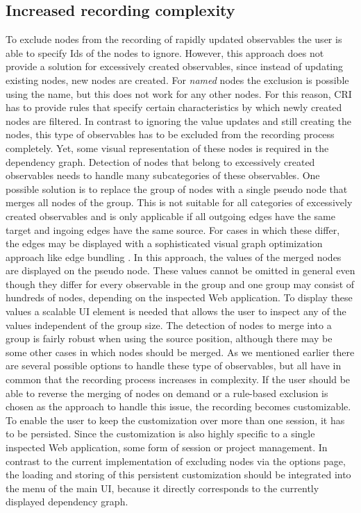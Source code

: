 \subsection{Increased recording complexity}
To exclude nodes from the recording of rapidly updated observables the user is able to specify Ids of the nodes to ignore. However, this approach does not provide a solution for excessively created observables, since instead of updating existing nodes, new nodes are created. For \emph{named} nodes the exclusion is possible using the name, but this does not work for any other nodes. For this reason, CRI has to provide rules that specify certain characteristics by which newly created nodes are filtered. In contrast to ignoring the value updates and still creating the nodes, this type of observables has to be excluded from the recording process completely. Yet, some visual representation of these nodes is required in the dependency graph. Detection of nodes that belong to excessively created observables needs to handle many subcategories of these observables. One possible solution is to replace the group of nodes with a single pseudo node that merges all nodes of the group. This is not suitable for all categories of excessively created observables and is only applicable if all outgoing edges have the same target and ingoing edges have the same source. For cases in which these differ, the edges may be displayed with a sophisticated visual graph optimization approach like edge bundling \cite{EdgeBundling}. In this approach, the values of the merged nodes are displayed on the pseudo node. These values cannot be omitted in general even though they differ for every observable in the group and one group may consist of hundreds of nodes, depending on the inspected Web application. To display these values a scalable UI element is needed that allows the user to inspect any of the values independent of the group size. The detection of nodes to merge into a group is fairly robust when using the source position, although there may be some other cases in which nodes should be merged. As we mentioned earlier there are several possible options to handle these type of observables, but all have in common that the recording process increases in complexity. If the user should be able to reverse the merging of nodes on demand or a rule-based exclusion is chosen as the approach to handle this issue, the recording becomes customizable. To enable the user to keep the customization over more than one session, it has to be persisted. Since the customization is also highly specific to a single inspected Web application, some form of session or project management. In contrast to the current implementation of excluding nodes via the options page, the loading and storing of this persistent customization should be integrated into the menu of the main UI, because it directly corresponds to the currently displayed dependency graph.
	
